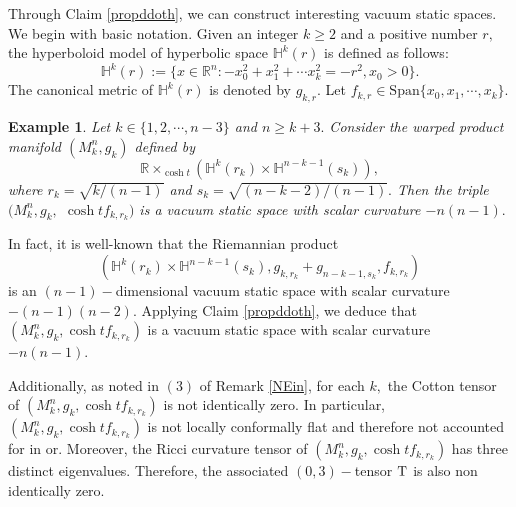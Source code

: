\documentclass[10pt,leqno,oneside]{amsart}
\newtheorem{Exa}{Example}
\begin{document}
{        Through Claim \ref{propddoth}, we can construct interesting vacuum static spaces. We begin with basic notation. Given an integer $k\ge2$ and a positive number $r,$ the hyperboloid model of hyperbolic space $\mathbb{H}^k(r)$ is defined as follows:
        \[\mathbb{H}^k(r):=\{x\in\mathbb{R}^n:-x_0^2+x_1^2+\cdots x_k^2=-r^2, x_0>0\}.\]
        The canonical metric of $\mathbb{H}^k(r)$ is denoted by $g_{k, r}.$ Let $f_{k, r}\in\text{Span}\{x_0, x_1, \cdots, x_k\}.$
    \begin{Exa}\label{basicex}
        Let $k\in\{1,2,\cdots,n-3\}$ and $n\geq k+3.$ Consider the warped product manifold $(M^n_k, g_k)$ defined by
        $$\mathbb{R}\times_{\cosh t}\left(\mathbb{H}^k(r_{k})\times\mathbb{H}^{n-k-1}(s_k)\right),$$
        where $r_{k}=\sqrt{k/(n-1)}$ and $s_k=\sqrt{(n-k-2)/(n-1)}.$
        Then the triple $(M^n_k, g_k, $ $\cosh t f_{k,r_{k}})$ is a vacuum static space with scalar curvature $-n(n-1).$
    \end{Exa}

        In fact, it is well-known that the Riemannian product
        $$\left(\mathbb{H}^k(r_{k})\times\mathbb{H}^{n-k-1}(s_{k}), g_{k,r_{k}}+g_{n-k-1, s_{k}}, f_{k,r_{k}}\right)$$
        is an $(n-1)-$dimensional vacuum static space with scalar curvature $-(n-1)(n-2).$ Applying Claim {\rm\ref{propddoth}}, we deduce that $(M^n_k, g_k, \cosh t f_{k,r_{k}})$ is a vacuum static space with scalar curvature $-n(n-1).$

        Additionally, as noted in $(3)$ of Remark \ref{NEin}, for each $k,$ the Cotton tensor of $(M^n_k, g_k, \cosh t f_{k,r_{k}})$ is not identically zero. In particular, $(M^n_k, g_k, \cosh t f_{k,r_{k}})$ is not locally conformally flat and therefore not accounted for in \cite{Lafontaine1983} or\cite{Kobayashi1982}. Moreover, the Ricci curvature tensor of $(M^n_k, g_k, \cosh t f_{k,r_{k}})$ has three distinct eigenvalues. Therefore, the associated $(0,3)-$tensor ${\rm T}$ is also non identically zero.

}
\end{document}
